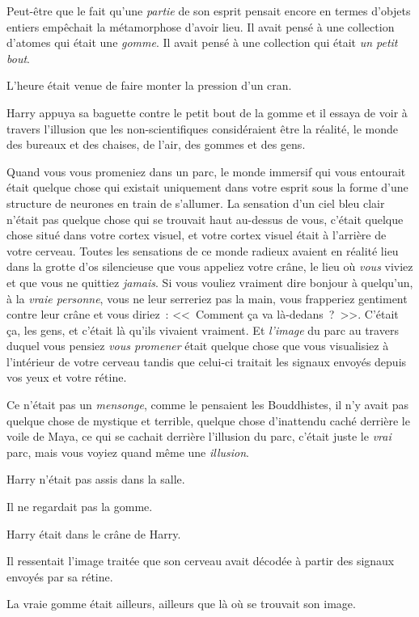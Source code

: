 Peut-être que le fait qu'une \emph{partie} de son esprit pensait encore en termes d'objets entiers empêchait la métamorphose d'avoir lieu. Il avait pensé à une collection d'atomes qui était une \emph{gomme}. Il avait pensé à une collection qui était \emph{un petit bout}.

L'heure était venue de faire monter la pression d'un cran.

Harry appuya sa baguette contre le petit bout de la gomme et il essaya de voir à travers l'illusion que les non-scientifiques considéraient être la réalité, le monde des bureaux et des chaises, de l'air, des gommes et des gens.

Quand vous vous promeniez dans un parc, le monde immersif qui vous entourait était quelque chose qui existait uniquement dans votre esprit sous la forme d'une structure de neurones en train de s'allumer. La sensation d'un ciel bleu clair n'était pas quelque chose qui se trouvait haut au-dessus de vous, c'était quelque chose situé dans votre cortex visuel, et votre cortex visuel était à l'arrière de votre cerveau. Toutes les sensations de ce monde radieux avaient en réalité lieu dans la grotte d'os silencieuse que vous appeliez votre crâne, le lieu où \emph{vous} viviez et que vous ne quittiez \emph{jamais}. Si vous vouliez vraiment dire bonjour à quelqu'un, à la \emph{vraie personne}, vous ne leur serreriez pas la main, vous frapperiez gentiment contre leur crâne et vous diriez~: <<~Comment ça va là-dedans~?~>>. C'était ça, les gens, et c'était là qu'ils vivaient vraiment. Et \emph{l'image} du parc au travers duquel vous pensiez \emph{vous promener} était quelque chose que vous visualisiez à l'intérieur de votre cerveau tandis que celui-ci traitait les signaux envoyés depuis vos yeux et votre rétine.

Ce n'était pas un \emph{mensonge}, comme le pensaient les Bouddhistes, il n'y avait pas quelque chose de mystique et terrible, quelque chose d'inattendu caché derrière le voile de Maya, ce qui se cachait derrière l'illusion du parc, c'était juste le \emph{vrai} parc, mais vous voyiez quand même une \emph{illusion}.

Harry n'était pas assis dans la salle.

Il ne regardait pas la gomme.

Harry était dans le crâne de Harry.

Il ressentait l'image traitée que son cerveau avait décodée à partir des signaux envoyés par sa rétine.

La vraie gomme était ailleurs, ailleurs que là où se trouvait son image.

